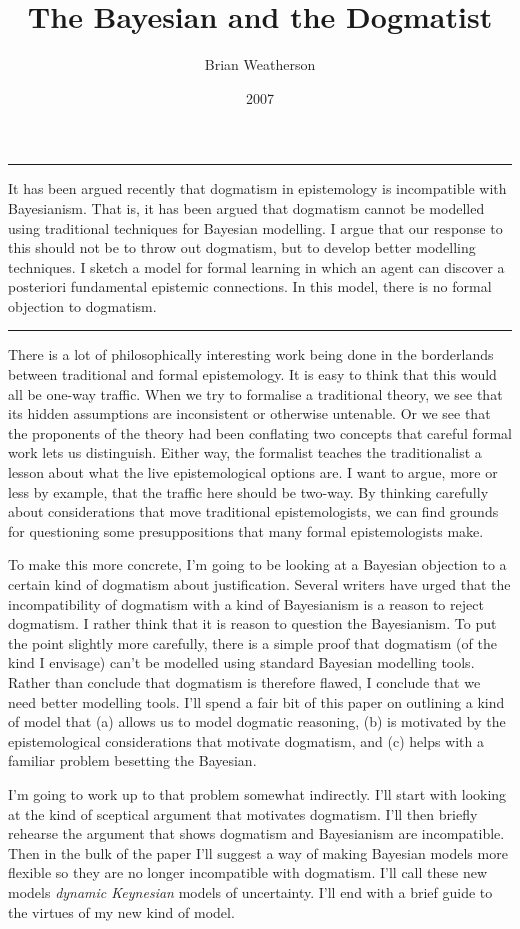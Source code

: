 \documentclass[
  10pt,
  letterpaper,
  DIV=11,
  numbers=noendperiod,
  twoside]{scrartcl}
\title{The Bayesian and the Dogmatist}
\author{Brian Weatherson}
\date{2007}
\renewenvironment{abstract}
 {\vspace{-1.25cm}
 \quotation\small\noindent\rule{\linewidth}{.5pt}\par\smallskip
 \noindent }
 {\par\noindent\rule{\linewidth}{.5pt}\endquotation}
\begin{document}
\maketitle
\begin{abstract}
It has been argued recently that dogmatism in epistemology is
incompatible with Bayesianism. That is, it has been argued that
dogmatism cannot be modelled using traditional techniques for Bayesian
modelling. I argue that our response to this should not be to throw out
dogmatism, but to develop better modelling techniques. I sketch a model
for formal learning in which an agent can discover a posteriori
fundamental epistemic connections. In this model, there is no formal
objection to dogmatism.
\end{abstract}

There is a lot of philosophically interesting work being done in the
borderlands between traditional and formal epistemology. It is easy to
think that this would all be one-way traffic. When we try to formalise a
traditional theory, we see that its hidden assumptions are inconsistent
or otherwise untenable. Or we see that the proponents of the theory had
been conflating two concepts that careful formal work lets us
distinguish. Either way, the formalist teaches the traditionalist a
lesson about what the live epistemological options are. I want to argue,
more or less by example, that the traffic here should be two-way. By
thinking carefully about considerations that move traditional
epistemologists, we can find grounds for questioning some
presuppositions that many formal epistemologists make.

To make this more concrete, I'm going to be looking at a Bayesian
objection to a certain kind of dogmatism about justification. Several
writers have urged that the incompatibility of dogmatism with a kind of
Bayesianism is a reason to reject dogmatism. I rather think that it is
reason to question the Bayesianism. To put the point slightly more
carefully, there is a simple proof that dogmatism (of the kind I
envisage) can't be modelled using standard Bayesian modelling tools.
Rather than conclude that dogmatism is therefore flawed, I conclude that
we need better modelling tools. I'll spend a fair bit of this paper on
outlining a kind of model that (a) allows us to model dogmatic
reasoning, (b) is motivated by the epistemological considerations that
motivate dogmatism, and (c) helps with a familiar problem besetting the
Bayesian.

I'm going to work up to that problem somewhat indirectly. I'll start
with looking at the kind of sceptical argument that motivates dogmatism.
I'll then briefly rehearse the argument that shows dogmatism and
Bayesianism are incompatible. Then in the bulk of the paper I'll suggest
a way of making Bayesian models more flexible so they are no longer
incompatible with dogmatism. I'll call these new models \emph{dynamic
Keynesian} models of uncertainty. I'll end with a brief guide to the
virtues of my new kind of model.
\end{document}
